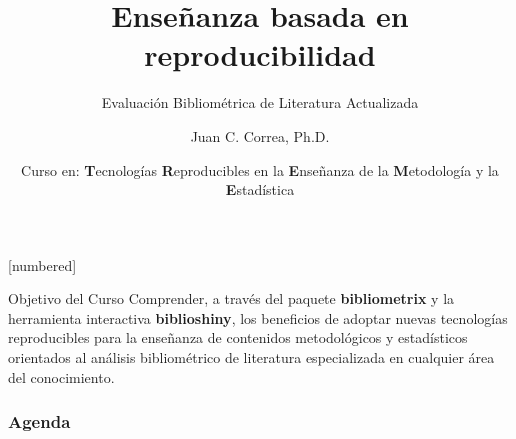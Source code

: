 \documentclass{beamer}
\begin{document}



\author[Juan C. Correa \textcolor{white}{(\url{https://correajc.com}})]{Juan C. Correa, Ph.D.}
\title[Enseñanza basada en reproducibilidad]{Enseñanza basada en reproducibilidad}
\subtitle{Evaluación Bibliométrica de Literatura Actualizada}
[numbered]
\date[Bogotá, Junio-2021]{Curso en: \textbf{T}ecnologías \textbf{R}eproducibles en la \textbf{E}nseñanza de la \textbf{M}etodología y la \textbf{E}stadística}


\begin{frame}
	\titlepage
\end{frame}

\begin{frame}
\begin{block}{Objetivo del Curso}
\vspace{0.3cm}
Comprender, a través del paquete \textbf{bibliometrix} y la herramienta interactiva \textbf{biblioshiny}, los beneficios de adoptar nuevas tecnologías reproducibles para la enseñanza de contenidos metodológicos y estadísticos orientados al análisis bibliométrico de literatura especializada en cualquier área del conocimiento.
\end{block}
\end{frame}



\begin{frame}
\frametitle{Agenda} 
\tableofcontents
\end{frame}
\end{document}
